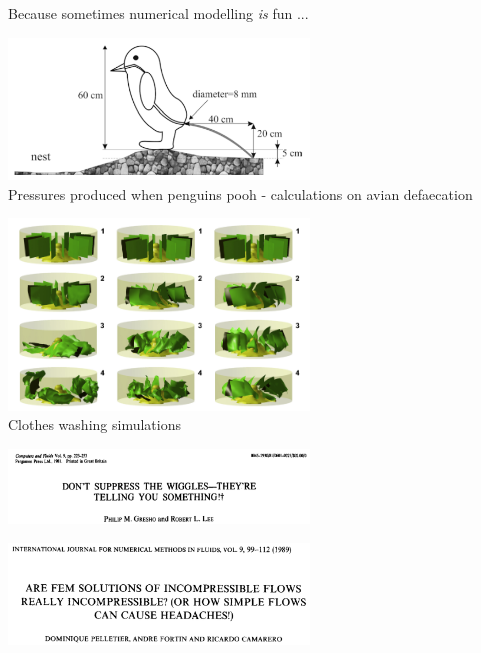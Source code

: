 Because sometimes numerical modelling {\sl is} fun ...

\begin{center}
\begin{minipage}{0.45\textwidth}
\centering
\includegraphics[width=8cm]{images/interesting/mega03}\\
{\tiny Pressures produced when penguins pooh - calculations on avian defaecation \cite{mega03}}
\end{minipage}\hfill
\begin{minipage}{0.45\textwidth}
\centering
\includegraphics[width=8cm]{images/interesting/akds14}\\
{\tiny Clothes washing simulations \cite{akds14}}
\end{minipage}
\end{center}

\vspace{1cm}

\begin{center}
\begin{minipage}{0.45\textwidth}
\centering
\includegraphics[width=8cm]{images/interesting/grle81}\\
{\tiny \cite{grle81}}
\end{minipage}\hfill
\begin{minipage}{0.45\textwidth}
\centering
\includegraphics[width=8cm]{images/interesting/pefc89}\\
{\tiny \cite{pefc89}}
\end{minipage}
\end{center}

